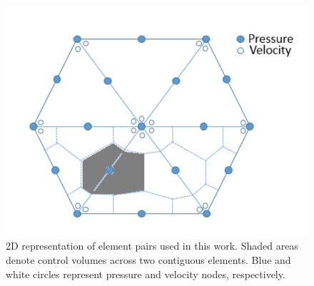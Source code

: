 


\begin{figure}[h]
\centering
\vbox{\includegraphics[width=.5\textwidth]{./Pics/P1DGP2.pdf}}
\caption{2D representation of  element pairs used in this work. Shaded areas denote control volumes across two contiguous elements. Blue and white circles represent pressure and velocity nodes, respectively.}
\label{fig:fem_cv}
\end{figure}

\clearpage


